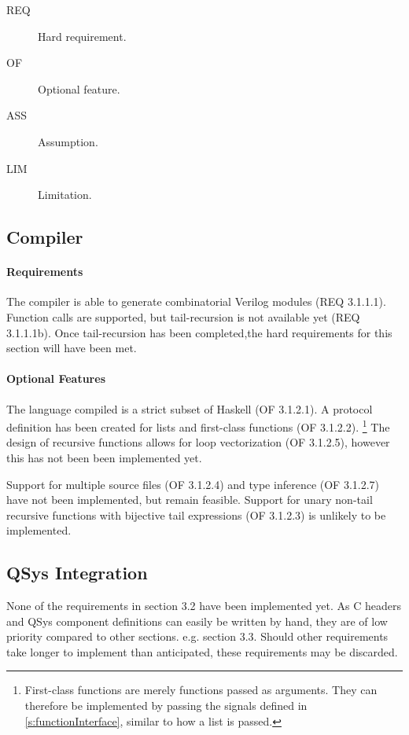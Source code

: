\documentclass[english,onecolumn]{article}
\begin{document}
\begin{description}
        \item[REQ] Hard requirement.
        \item[OF] Optional feature.
        \item[ASS] Assumption.
        \item[LIM] Limitation.
\end{description}

\subsection{Compiler}
\paragraph{Requirements}
The compiler is able to generate combinatorial Verilog modules (REQ 3.1.1.1). Function calls are supported, but tail-recursion is not available yet (REQ 3.1.1.1b).
Once tail-recursion has been completed,\footnotemark the hard requirements for this section will have been met.

\paragraph{Optional Features}
The language compiled is a strict subset of Haskell (OF 3.1.2.1). A protocol definition has been created for lists and first-class functions (OF 3.1.2.2).%
\footnote{First-class functions are merely functions passed as arguments. They can therefore be implemented by passing the signals defined in \ref{s:functionInterface}, similar to how a list is passed.}
The design of recursive functions allows for loop vectorization (OF 3.1.2.5), however this has not been been implemented yet.

Support for multiple source files (OF 3.1.2.4) and type inference (OF 3.1.2.7) have not been implemented, but remain feasible. Support for unary non-tail recursive functions with bijective tail expressions (OF 3.1.2.3) is unlikely to be implemented.

\subsection{QSys Integration}
None of the requirements in section 3.2 have been implemented yet.
As C headers and QSys component definitions can easily be written by hand, they are of low priority compared to other sections. e.g. section 3.3. Should other requirements take longer to implement than anticipated, these requirements may be discarded.
\end{document}
